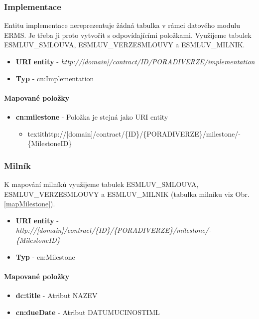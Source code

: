 \subsubsection{Implementace}

Entitu implementace nereprezentuje žádná tabulka v rámci datového modulu ERMS. Je třeba ji proto vytvořit s odpovídajícími položkami. Využijeme tabulek ESMLUV\_SMLOUVA, ESMLUV\_VERZESMLOUVY a ESMLUV\_MILNIK. 

\begin{itemize}
\item \textbf{URI entity} - \textit{http://[domain]/contract/{ID}/{PORADIVERZE}/implementation}
\item \textbf{Typ} - cn:Implementation
\end{itemize}

\paragraph*{Mapované položky}
\begin{itemize}
\item \textbf{cn:milestone} - Položka je stejná jako URI entity
	\begin{itemize}
	\item textit{http://[domain]/contract/\{ID\}/\{PORADIVERZE\}/milestone/-\\\{MilestoneID\}}
	\end{itemize}
\end{itemize}

\subsubsection{Milník}

K mapování milníků využijeme tabulek ESMLUV\_SMLOUVA, ESMLUV\_VERZESMLOUVY a ESMLUV\_MILNIK (tabulka milníku viz Obr. \ref{mapMilestone}).

\begin{itemize}
\item \textbf{URI entity} - \textit{http://[domain]/contract/\{ID\}/\{PORADIVERZE\}/milestone/-\\\{MilestoneID\}}
\item \textbf{Typ} - cn:Milestone
\end{itemize}

\paragraph*{Mapované položky}
\begin{itemize}
\item \textbf{dc:title} - Atribut NAZEV
\item \textbf{cn:dueDate} - Atribut DATUMUCINOSTIML
\end{itemize}

